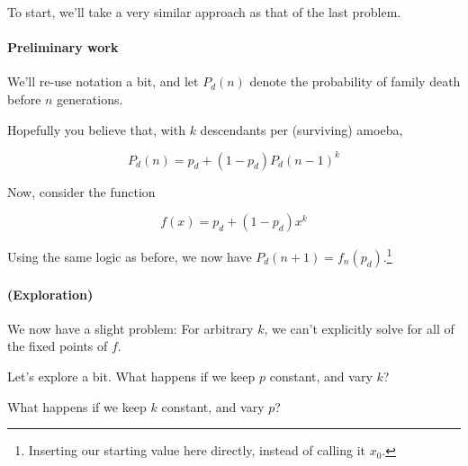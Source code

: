 To start, we'll take a very similar approach as that of the last problem.

\paragraph{Preliminary work}

We'll re-use notation a bit, and let $P_d(n)$ denote the probability of family death before $n$ generations. 

Hopefully you believe that, with $k$ descendants per (surviving) amoeba, 

\begin{equation*}
P_d(n) = p_d + (1 - p_d) P_d(n-1)^k
\end{equation*}

Now, consider the function 

\begin{equation}
f(x) = p_d + (1 - p_d) x^k
\end{equation} 

Using the same logic as before, we now have $P_d(n+1) = f_n(p_d)$.\footnote{Inserting our starting value here directly, instead of calling it $x_0$.}

\paragraph{(Exploration)}

We now have a slight problem: For arbitrary $k$, we can't explicitly solve for all of the fixed points of $f$. %

Let's explore a bit. What happens if we keep $p$ constant, and vary $k$?


What happens if we keep $k$ constant, and vary $p$?


%


